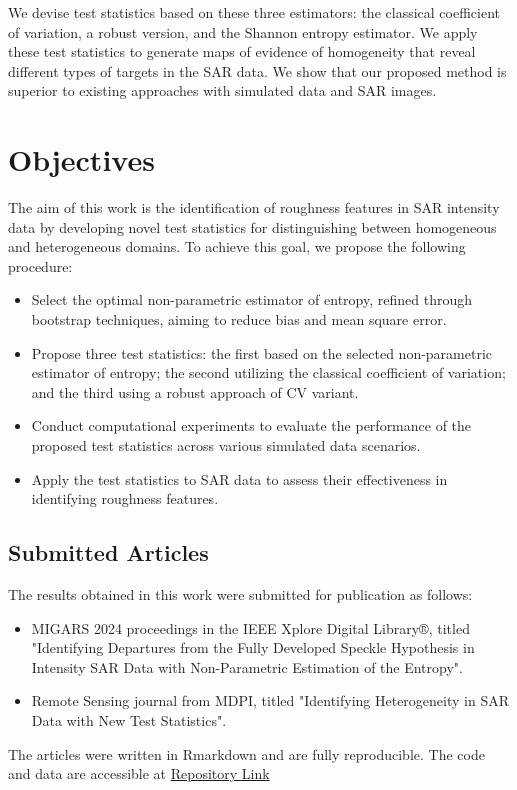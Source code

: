 We devise test statistics based on these three estimators: the classical
coefficient of variation, a robust version, and the Shannon entropy
estimator. We apply these test statistics to generate maps of evidence
of homogeneity that reveal different types of targets in the SAR data.
We show that our proposed method is superior to existing approaches with
simulated data and SAR images.





\section{Objectives}

The aim of this work is the identification of roughness features in SAR intensity data by developing novel test statistics for distinguishing between homogeneous and heterogeneous domains. To achieve this goal, we propose the following procedure:

\begin{itemize}
    \item Select the optimal non-parametric estimator of entropy, refined through bootstrap techniques, aiming to reduce bias and mean square error.
    \item Propose three test statistics: the first based on the selected non-parametric estimator of entropy; the second utilizing the classical coefficient of variation; and the third using a robust approach of CV variant.
    \item Conduct computational experiments to evaluate the performance of the proposed test statistics across various simulated data scenarios.
    \item Apply the test statistics to SAR data to assess their effectiveness in identifying roughness features.
\end{itemize}

\subsection{Submitted Articles}

The results obtained in this work were submitted for publication as follows:
\begin{itemize}
    \item  MIGARS 2024 proceedings in the IEEE Xplore Digital Library®, titled "Identifying Departures from the Fully Developed Speckle Hypothesis in Intensity SAR Data with Non-Parametric Estimation of the Entropy".
    \item  Remote Sensing journal from MDPI, titled "Identifying Heterogeneity in SAR Data with New Test Statistics".
\end{itemize}
The articles were written in Rmarkdown and are fully reproducible. 
The code and data are accessible at 
\href{https://github.com/rjaneth/identifying-heterogeneity-in-sar-data-with-new-test-statistics}{\textcolor[rgb]{0,0,1}{Repository Link}}


